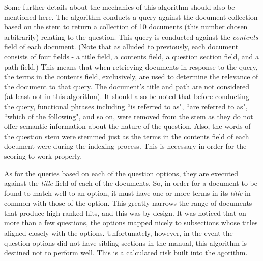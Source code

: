 Some further details about the mechanics of this algorithm should also be mentioned here.  The algorithm conducts a query against the document collection based on the stem to return a collection of 10 documents (this number chosen arbitrarily) relating to the question.  This query is conducted against the \emph{contents} field of each document.  (Note that as alluded to previously, each document consists of four fields - a title field, a contents field, a question section field, and a path field.)  This means that when retrieving documents in response to the query, the terms in the contents field, exclusively, are used to determine the relevance of the document to that query.  The document's title and path are not considered (at least not in this algorithm).  It should also be noted that before conducting the query, functional phrases including ``is referred to as", ``are referred to as", ``which of the following", and so on, were removed from the stem as they do not offer semantic information about the nature of the question.  Also, the words of the question stem were stemmed just as the terms in the contents field of each document were during the indexing process.  This is necessary in order for the scoring to work properly.  

As for the queries based on each of the question options, they are executed against the 
\emph{title} field of each of the documents.  So, in order for a document to be found to match well to an option, it must have one or more terms in its \emph{title} in common with those of the option.  This greatly narrows the range of documents that produce high ranked hits, and this was by design.  It was noticed that on more than a few questions, the options mapped nicely to subsections whose titles aligned closely with the options.  Unfortunately, however, in the event the question options did not have sibling sections in the manual, this algorithm is destined not to perform well.  This is a calculated risk built into the agorithm.



